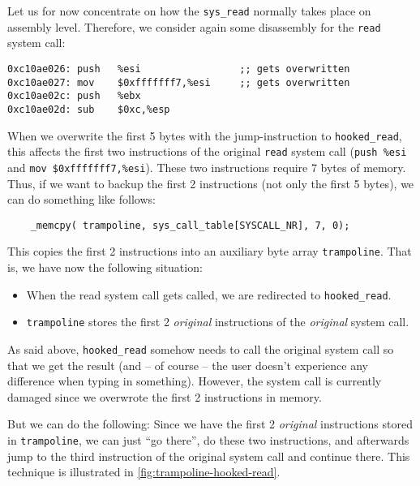 \documentclass[10pt, letterpaper]{article}
\begin{document}
Let us for now concentrate on how the \texttt{sys\_read} normally takes place on assembly level. Therefore, we consider again some disassembly for the \texttt{read} system call:

\begin{verbatim}
0xc10ae026:	push   %esi                 ;; gets overwritten
0xc10ae027:	mov    $0xfffffff7,%esi     ;; gets overwritten
0xc10ae02c:	push   %ebx
0xc10ae02d:	sub    $0xc,%esp
\end{verbatim}

When we overwrite the first 5 bytes with the jump-instruction to \texttt{hooked\_read}, this affects the first two instructions of the original \texttt{read} system call (\texttt{push \%esi} and \texttt{mov \$0xfffffff7,\%esi}). These two instructions require 7 bytes of memory. Thus, if we want to backup the first 2 instructions (not only the first 5 bytes), we can do something like follows:

\begin{verbatim}
    _memcpy( trampoline, sys_call_table[SYSCALL_NR], 7, 0);
\end{verbatim}

This copies the first 2 instructions into an auxiliary byte array \texttt{trampoline}. That is, we have now the following situation:

\begin{itemize}
\item When the read system call gets called, we are redirected to \texttt{hooked\_read}.
\item \texttt{trampoline} stores the first 2 \emph{original} instructions of the \emph{original} system call.
\end{itemize}

As said above, \texttt{hooked\_read} somehow needs to call the original system call so that we get the result (and -- of course -- the user doesn't experience any difference when typing in something). However, the system call is currently damaged since we overwrote the first 2 instructions in memory.

But we can do the following: Since we have the first 2 \emph{original} instructions stored in \texttt{trampoline}, we can just ``go there'', do these two instructions, and afterwards jump to the third instruction of the original system call and continue there. This technique is illustrated in \autoref{fig:trampoline-hooked-read}.
\end{document}
